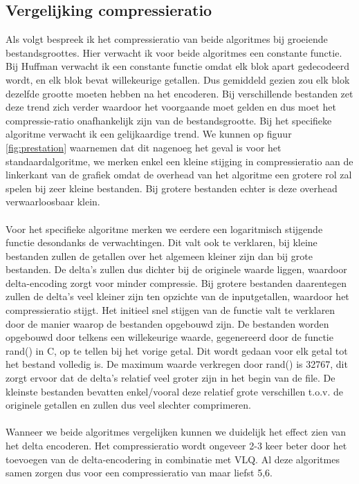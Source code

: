 \documentclass[11pt, a4paper]{article}
\begin{document}
\subsection{Vergelijking compressieratio}
Als volgt bespreek ik het compressieratio van beide algoritmes bij groeiende bestandsgroottes. Hier verwacht ik voor beide algoritmes een constante functie. Bij Huffman verwacht ik een constante functie omdat elk blok apart gedecodeerd wordt, en elk blok bevat willekeurige getallen. Dus gemiddeld gezien zou elk blok dezelfde grootte moeten hebben na het encoderen. 
Bij verschillende bestanden zet deze trend zich verder waardoor het voorgaande moet gelden en dus moet het compressie-ratio onafhankelijk zijn van de bestandsgrootte. Bij het specifieke algoritme verwacht ik een gelijkaardige trend. We kunnen op figuur \ref{fig:prestation} waarnemen dat dit nagenoeg het geval is voor het standaardalgoritme, we merken enkel een kleine stijging in compressieratio aan de linkerkant van de grafiek omdat de overhead van het algoritme een grotere rol zal spelen bij zeer kleine bestanden. Bij grotere bestanden echter is deze overhead verwaarloosbaar klein.
\\\\Voor het specifieke algoritme merken we eerdere een logaritmisch stijgende functie desondanks de verwachtingen. Dit valt ook te verklaren, bij kleine bestanden zullen de getallen over het algemeen kleiner zijn dan bij grote bestanden. De delta's zullen dus dichter bij de originele waarde liggen, waardoor delta-encoding zorgt voor minder compressie. Bij grotere bestanden daarentegen zullen de delta's veel kleiner zijn ten opzichte van de inputgetallen, waardoor het compressieratio stijgt. Het initieel snel stijgen van de functie valt te verklaren door de manier waarop de bestanden opgebouwd zijn. De bestanden worden opgebouwd door telkens een willekeurige waarde, gegenereerd door de functie rand() in C, op te tellen bij het vorige getal. Dit wordt gedaan voor elk getal tot het bestand volledig is. De maximum waarde verkregen door rand() is 32767, dit zorgt ervoor dat de delta's relatief veel groter zijn in het begin van de file. De kleinste bestanden bevatten enkel/vooral deze relatief grote verschillen t.o.v. de originele getallen en zullen dus veel slechter comprimeren.
\\\\Wanneer we beide algoritmes vergelijken kunnen we duidelijk het effect zien van het delta encoderen. Het compressieratio wordt ongeveer 2-3 keer beter door het toevoegen van de delta-encodering in combinatie met VLQ. Al deze algoritmes samen zorgen dus voor een compressieratio van maar liefst 5,6.
\end{document}
